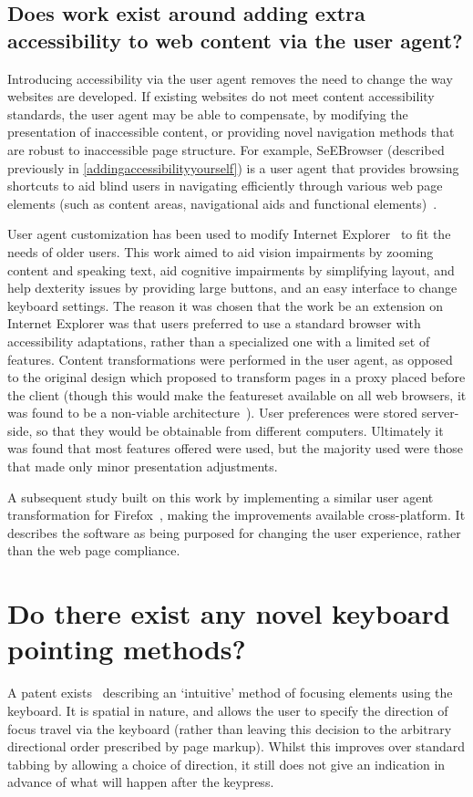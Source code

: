 \documentclass[11pt,openright,a4paper]{report}
\begin{document}
\subsection{Does work exist around adding extra accessibility to web content via the user agent?}
Introducing accessibility via the user agent removes the need to change the way websites are developed. If existing websites do not meet content accessibility standards, the user agent may be able to compensate, by modifying the presentation of inaccessible content, or providing novel navigation methods that are robust to inaccessible page structure. For example, SeEBrowser (described previously in \cref{addingaccessibilityyourself}) is a user agent that provides browsing shortcuts to aid blind users in navigating efficiently through various web page elements (such as content areas, navigational aids and functional elements)~\cite{kouroupetroglou2007browsing}.

User agent customization has been used to modify Internet Explorer~\cite{hanson2005personalization} to fit the needs of older users. This work aimed to aid vision impairments by zooming content and speaking text, aid cognitive impairments by simplifying layout, and help dexterity issues by providing large buttons, and an easy interface to change keyboard settings. The reason it was chosen that the work be an extension on Internet Explorer was that users preferred to use a standard browser with accessibility adaptations, rather than a specialized one with a limited set of features. Content transformations were performed in the user agent, as opposed to the original design which proposed to transform pages in a proxy placed before the client (though this would make the featureset available on all web browsers, it was found to be a non-viable architecture~\cite{fairweather2002distributed,czaja2002designing,hanson2005achieving}). User preferences were stored server-side, so that they would be obtainable from different computers. Ultimately it was found that most features offered were used, but the majority used were those that made only minor presentation adjustments.

A subsequent study built on this work by implementing a similar user agent transformation for Firefox~\cite{hanson2005improving}, making the improvements available cross-platform. It describes the software as being purposed for changing the user experience, rather than the web page compliance.
\section{Do there exist any novel keyboard pointing methods?}
\label{novelpointing}
A patent exists~\cite{Mouyade:2011:EP2385452} describing an `intuitive' method of focusing elements using the keyboard. It is spatial in nature, and allows the user to specify the direction of focus travel via the keyboard (rather than leaving this decision to the arbitrary directional order prescribed by page markup). Whilst this improves over standard tabbing by allowing a choice of direction, it still does not give an indication in advance of what will happen after the keypress.
\end{document}

